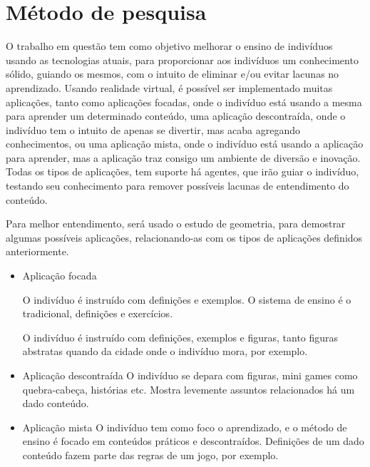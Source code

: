 \documentclass[12pt]{article}
\begin{document}
\newpage
\section{Método de pesquisa}

\hspace*{5mm}

        O trabalho em questão tem como objetivo melhorar o ensino de indivíduos usando as
        tecnologias atuais, para proporcionar aos indivíduos um conhecimento sólido, guiando os
        mesmos, com o intuito de eliminar e/ou evitar lacunas no aprendizado. Usando realidade
        virtual, é possível ser implementado muitas aplicações, tanto como aplicações focadas, onde
        o indivíduo está usando a mesma para aprender um determinado conteúdo, uma aplicação
        descontraída, onde o indivíduo tem o intuito de apenas se divertir, mas acaba agregando
        conhecimentos, ou uma aplicação mista, onde o indivíduo está usando a aplicação para
        aprender, mas a aplicação traz consigo um ambiente de diversão e inovação. Todas os tipos de
        aplicações, tem suporte há agentes, que irão guiar o indivíduo, testando seu conhecimento
        para remover possíveis lacunas de entendimento do conteúdo.

        \medskip
        Para melhor entendimento, será usado o estudo de geometria, para demostrar algumas possíveis
        aplicações, relacionando-as com os tipos de aplicações definidos anteriormente.

        \begin{itemize}

            \item Aplicação focada

            \subitem O indivíduo é instruído com definições e exemplos.
            O sistema de ensino é o tradicional, definições e exercícios.

            \subitem O indivíduo é instruído com definições, exemplos e figuras,
            tanto figuras abstratas quando da cidade onde o indivíduo mora, por exemplo.

            \item Aplicação descontraída
            \subitem O indivíduo se depara com figuras, mini games como quebra-cabeça, histórias etc.
            Mostra levemente assuntos relacionados há um dado conteúdo.

            \item Aplicação mista
            \subitem O indivíduo tem como foco o aprendizado, e o método de ensino é focado em
            conteúdos práticos e descontraídos. Definições de um dado conteúdo fazem parte das regras
            de um jogo, por exemplo.

        \end{itemize}
\end{document}
